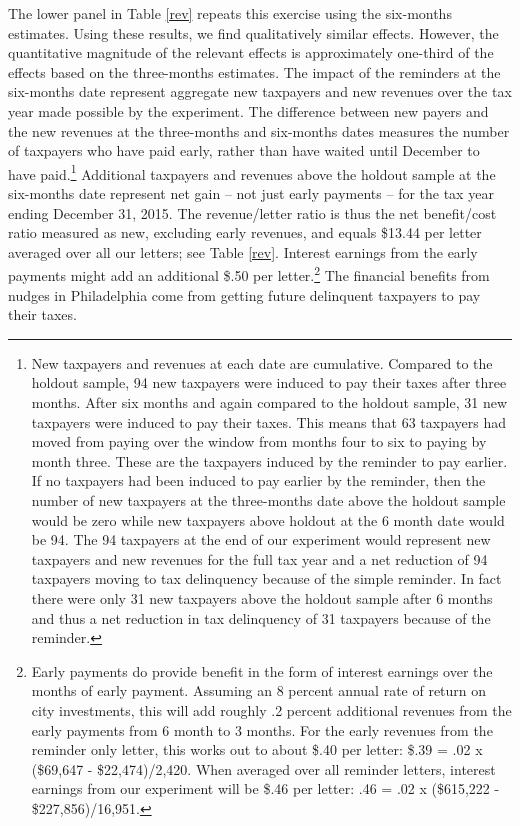 \documentclass[12pt]{article}
\begin{document}
The lower panel in Table \ref{rev} repeats this exercise using the
six-months estimates.  Using these results, we find qualitatively
similar effects. However, the quantitative magnitude of the relevant
effects is approximately one-third of the effects based on the three-months
estimates.  The impact of the reminders at the six-months date represent
aggregate new taxpayers and new revenues over the tax year made
possible by the experiment.  The difference between new payers and the
new revenues at the three-months and six-months dates measures the
number of taxpayers who have paid early, rather than have waited until
December to have paid.\footnote{New taxpayers and revenues at each
  date are cumulative.  Compared to the holdout sample, 94 new
  taxpayers were induced to pay their taxes after three months. After six
  months and again compared to the holdout sample, 31 new taxpayers
  were induced to pay their taxes.  This means that 63 taxpayers had
  moved from paying over the window from months four to six to paying
  by month three.  These are the taxpayers induced by the reminder to
  pay earlier.  If no taxpayers had been induced to pay earlier by the
  reminder, then the number of new taxpayers at the three-months date
  above the holdout sample would be zero while new taxpayers above
  holdout at the 6 month date would be 94. The 94 taxpayers at the end
  of our experiment would represent new taxpayers and new revenues for
  the full tax year and a net reduction of 94 taxpayers moving to tax
  delinquency because of the simple reminder.  In fact there were only
  31 new taxpayers above the holdout sample after 6 months and thus a
  net reduction in tax delinquency of 31 taxpayers because of the
  reminder.}  Additional taxpayers and revenues above the holdout sample
at the six-months date represent net gain -- not just early payments --
for the tax year ending December 31, 2015.  The revenue/letter ratio
is thus the net benefit/cost ratio measured as new, excluding early
revenues, and equals \$13.44 per letter averaged over all our letters;
see Table \ref{rev}.  Interest earnings from the early payments might
add an additional \$.50 per letter.\footnote{Early payments do provide
  benefit in the form of interest earnings over the months of early
  payment.  Assuming an 8 percent annual rate of return on city
  investments, this will add roughly .2 percent additional revenues
  from the early payments from 6 month to 3 months.  For the early
  revenues from the reminder only letter, this works out to about
  \$.40 per letter: \$.39 = .02 x (\$69,647 - \$22,474)/2,420.  When
  averaged over all reminder letters, interest earnings from our
  experiment will be \$.46 per letter: .46 = .02 x (\$615,222 -
  \$227,856)/16,951.} The financial benefits from nudges in
Philadelphia come from getting future delinquent taxpayers to pay
their taxes.
\end{document}
